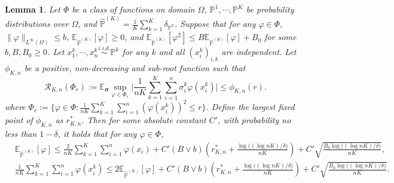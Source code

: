 \documentclass{article}
\numberwithin{equation}{section}
\newcommand{\E}{\mathbb{E}}
\newtheorem{lemma}[thm]{Lemma}
\theoremstyle{definition}
\renewcommand{\P}{\mathbb{P}}
\begin{document}
\begin{lemma}\label{lem:local_rademacher_meta}
    Let $\Phi$ be a class of functions on domain $\Omega$, $\P^1,\cdots,\P^K$ be probability distributions over $\Omega$, 
    and $\widehat{\P}^{(K)}=\frac{1}{K}\sum_{k=1}^K\delta_{\P^k}$.
    Suppose that for any $\varphi\in\Phi$, $\|\varphi\|_{L^\infty(\Omega)}\leq b$, $\E_{\widehat{\P}^{(K)}} [\varphi]\geq 0$, and $\E_{\widehat{\P}^{(K)}} [\varphi^2] \leq B\E_{\widehat{\P}^{(K)}} [\varphi]+B_0$ for some $b,B,B_0\geq 0$. 
    Let $x^k_1,\cdots,x^k_n\overset{\textit{i.i.d.}}{\sim}\P^k$ for any $k$ and all $(x_i^k)_{i,k}$ are independent. 
    Let $\phi_{K,n}$ be a positive, non-decreasing and sub-root function such that
    \begin{equation}
        \mathcal{R}_{K,n}(\Phi_r):=\E_{\bm{\sigma}} \sup_{\varphi\in\Phi_r}\Big|\frac{1}{nK}\sum_{k=1}^K\sum_{i=1}^n\sigma_i^k\varphi(x_i^k)\Big|\leq \phi_{K,n}(r).
    \end{equation}
    where $\Phi_r:= \Big\{\varphi\in\Phi: \frac{1}{nK}\sum_{k=1}^K\sum_{i=1}^n{(\varphi(x_i^k))^2}\leq r\Big\}$.
    Define the largest fixed point of $\phi_{K,n}$ as $r_{K,n}^*$.
    Then for some absolute constant $C'$, with probability no less than $1-\delta$, it holds that for any $\varphi\in\Phi$,
    \begin{align}
        &\E_{\widehat{\P}^{(K)}}[\varphi]\leq \frac{2}{nK}\sum_{k=1}^K\sum_{i=1}^n\varphi(x_i) + C'(B\vee b)\left(r_{K,n}^* + \frac{\log\big((\log nK)/\delta\big)}{nK}\right)+C'\sqrt{\frac{B_0\log\big((\log nK)/\delta\big)}{nK}},\\
        &\frac{1}{nK}\sum_{k=1}^K\sum_{i=1}^n\varphi(x_i^k)\leq 2\E_{\widehat{\P}^{(K)}}[\varphi] + C'(B\vee b)\left(r_{K,n}^* + \frac{\log\big((\log nK)/\delta\big)}{nK}\right)+C'\sqrt{\frac{B_0\log\big((\log nK)/\delta\big)}{nK}}. 
    \end{align}
\end{lemma}
\end{document}
